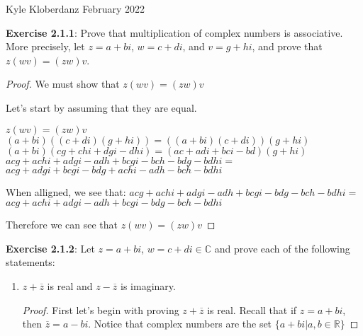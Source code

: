 \documentclass[a4paper]{article}
\begin{document}
\begin{myparindent}{0pt}

Kyle Kloberdanz  February 2022 \newline

\textbf{Exercise 2.1.1}:
Prove that multiplication of complex numbers is associative. More precisely,
let $z = a + bi$, $w = c + di$, and $v = g + hi$, and prove that
$z(wv) = (zw)v$.

\begin{proof}
    We must show that $z(wv) = (zw)v$ \newline

    Let's start by assuming that they are equal.

    $z(wv) = (zw)v$ \newline
    \newline
    $(a + bi)((c + di)(g + hi)) = ((a + bi)(c + di))(g + hi)$ \newline
    \newline
    $(a + bi)(cg+ chi + dgi - dhi) = (ac + adi + bci - bd)(g + hi) $ \newline
    \newline
    $acg + achi + adgi - adh + bcgi - bch - bdg - bdhi = $ \newline
    $acg + adgi + bcgi - bdg + achi - adh - bch - bdhi$ \newline

    When alligned, we see that: \newline
    $acg + achi + adgi - adh + bcgi - bdg - bch - bdhi = $ \newline
    $acg + achi + adgi - adh + bcgi - bdg - bch - bdhi$ \newline

    Therefore we can see that $z(wv) = (zw)v$ \newline
\end{proof}

\textbf{Exercise 2.1.2}:
Let $z = a + bi$, $w = c + di \in \mathbb{C}$ and prove each of the following
statements:

\begin{enumerate}[label=(\roman*)]
  \item $z + \overline{z}$ is real and $z - \overline{z}$ is imaginary.
    \begin{proof}
        First let's begin with proving $z + \overline{z}$ is real. \newline
        Recall that if $z = a + bi$, then $\overline{z} = a - bi$. \newline
        Notice that complex numbers are the set $\{ a + bi | a, b \in \mathbb{R} \}$


\end{proof}
\end{enumerate}
\end{myparindent}
\end{document}
